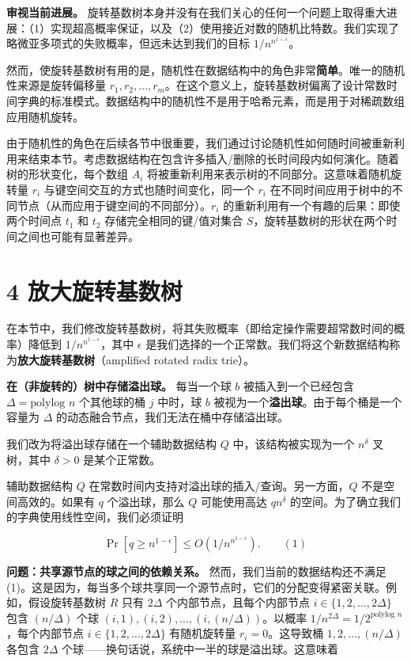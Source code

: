 \documentclass[12pt,a4paper]{ctexart}
\theoremstyle{remark}
\begin{document}
\textbf{审视当前进展。} 旋转基数树本身并没有在我们关心的任何一个问题上取得重大进展：（1）实现超高概率保证，以及（2）使用接近对数的随机比特数。我们实现了略微亚多项式的失败概率，但远未达到我们的目标 $1/n^{n^{1-\epsilon}}$。

然而，使旋转基数树有用的是，随机性在数据结构中的角色非常\textbf{简单}。唯一的随机性来源是旋转偏移量 $r_1,r_2,\ldots,r_m$。在这个意义上，旋转基数树偏离了设计常数时间字典的标准模式。数据结构中的随机性不是用于哈希元素，而是用于对稀疏数组应用随机旋转。

由于随机性的角色在后续各节中很重要，我们通过讨论随机性如何随时间被重新利用来结束本节。考虑数据结构在包含许多插入/删除的长时间段内如何演化。随着树的形状变化，每个数组 $A_i$ 将被重新利用来表示树的不同部分。这意味着随机旋转量 $r_i$ 与键空间交互的方式也随时间变化，同一个 $r_i$ 在不同时间应用于树中的不同节点（从而应用于键空间的不同部分）。$r_i$ 的重新利用有一个有趣的后果：即使两个时间点 $t_1$ 和 $t_2$ 存储完全相同的键/值对集合 $S$，旋转基数树的形状在两个时间之间也可能有显著差异。

\medskip
\section{4 放大旋转基数树}
在本节中，我们修改旋转基数树，将其失败概率（即给定操作需要超常数时间的概率）降低到 $1/n^{n^{1-\epsilon}}$，其中 $\epsilon$ 是我们选择的一个正常数。我们将这个新数据结构称为\textbf{放大旋转基数树}（amplified rotated radix trie）。

\textbf{在（非旋转的）树中存储溢出球。} 每当一个球 $b$ 被插入到一个已经包含 $\Delta=\text{polylog } n$ 个其他球的桶 $j$ 中时，球 $b$ 被视为一个\textbf{溢出球}。由于每个桶是一个容量为 $\Delta$ 的动态融合节点，我们无法在桶中存储溢出球。

我们改为将溢出球存储在一个辅助数据结构 $Q$ 中，该结构被实现为一个 $n^{\delta}$ 叉树，其中 $\delta>0$ 是某个正常数。

辅助数据结构 $Q$ 在常数时间内支持对溢出球的插入/查询。另一方面，$Q$ 不是空间高效的。如果有 $q$ 个溢出球，那么 $Q$ 可能使用高达 $q n^{\delta}$ 的空间。为了确立我们的字典使用线性空间，我们必须证明

$$\Pr[q\geq n^{1-\epsilon}]\leq O\left(1/n^{n^{1-\epsilon}}\right).\qquad(1)$$

\textbf{问题：共享源节点的球之间的依赖关系。} 然而，我们当前的数据结构还不满足 (1)。这是因为，每当多个球共享同一个源节点时，它们的分配变得紧密关联。例如，假设旋转基数树 $R$ 只有 $2\Delta$ 个内部节点，且每个内部节点 $i\in\{1,2,\ldots,2\Delta\}$ 包含 $(n/\Delta)$ 个球 $(i,1),(i,2),\ldots,(i,(n/\Delta))$。以概率 $1/n^{2\Delta}=1/2^{\text{polylog } n}$，每个内部节点 $i\in\{1,2,\ldots,2\Delta\}$ 有随机旋转量 $r_i=0$。这导致桶 $1,2,\ldots,(n/\Delta)$ 各包含 $2\Delta$ 个球——换句话说，系统中一半的球是溢出球。这意味着
\end{document}
